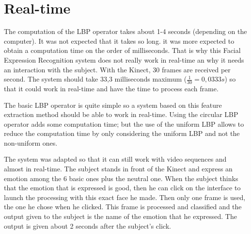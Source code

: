 \section{Real-time}

\vspace{\baselineskip}
\noindent The computation of the LBP operator takes about 1-4 seconds (depending on the computer). It was not expected that it takes so long. it was more expected to obtain a computation time on the order of milliseconds. That is why this Facial Expression Recognition system does not really work in real-time an why it needs an interaction with the subject. With the Kinect, 30 frames are received per second. The system should take 33,3 milliseconds maximum ($ \frac{1}{30} = 0,0333 s $) so that it could work in real-time and have the time to process each frame. 
\newline

\noindent The basic LBP operator is quite simple so a system based on this feature extraction method should be able to work in real-time. Using the circular LBP operator adds some computation time; but the use of the uniform LBP allows to reduce the computation time by only considering the uniform LBP and not the non-uniform ones.
\newline

\noindent The system was adapted so that it can still work with video sequences and almost in real-time. The subject stands in front of the Kinect and express an emotion among the 6 basic ones plus the neutral one. When the subject thinks that the emotion that is expressed is good, then he can click on the interface to launch the processing with this exact face he made. Then only one frame is used, the one he chose when he clicked. This frame is processed and classified and the output given to the subject is the name of the emotion that he expressed. The output is given about 2 seconds after the subject's click.
\newline